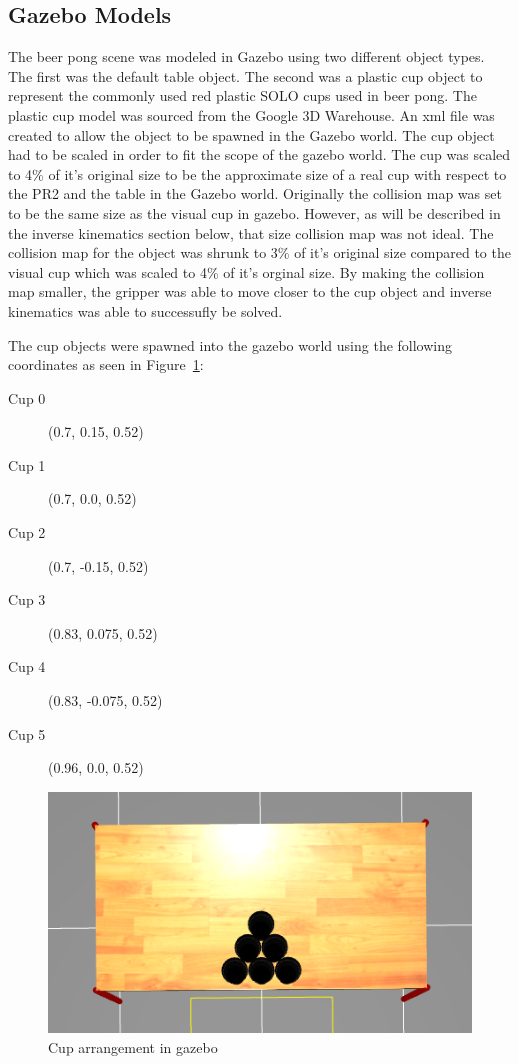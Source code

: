 \documentclass[letterpaper, 10 pt, conference]{ieeeconf}  %
\begin{document}
\subsection{Gazebo Models}
The beer pong scene was modeled in Gazebo using two different object types. The first was the default table object. The second was a plastic cup object to represent the commonly used red plastic SOLO cups used in beer pong. The plastic cup model was sourced from the Google 3D Warehouse. An xml file was created to allow the object to be spawned in the Gazebo world. The cup object had to be scaled in order to fit the scope of the gazebo world. The cup was scaled to 4\% of it's original size to be the approximate size of a real cup with respect to the PR2 and the table in the Gazebo world. Originally the collision map was set to be the same size as the visual cup in gazebo. However, as will be described in the inverse kinematics section below, that size collision map was not ideal. The collision map for the object was shrunk to 3\% of it's original size compared to the visual cup which was scaled to 4\% of it's orginal size. By making the collision map smaller, the gripper was able to move closer to the cup object and inverse kinematics was able to successufly be solved. 

The cup objects were spawned into the gazebo world using the following coordinates as seen in Figure~\ref{fig:cups}:

\begin{description}
\item[Cup 0]  (0.7, 0.15, 0.52)
\item[Cup 1] (0.7, 0.0, 0.52)
\item[Cup 2] (0.7, -0.15, 0.52)
\item[Cup 3] (0.83, 0.075, 0.52)
\item[Cup 4] (0.83, -0.075, 0.52)
\item[Cup 5] (0.96, 0.0, 0.52)
\end{description}

\begin{figure}[thpb]
      \centering
	  \includegraphics[scale =0.3]{cups}
      \caption{Cup arrangement in gazebo}
      \label{fig:cups}
\end{figure}
\end{document}
